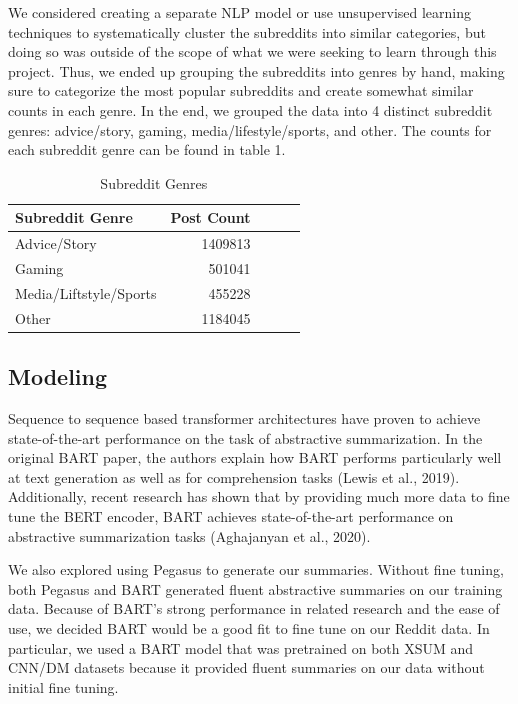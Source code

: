 \documentclass[11pt,a4paper, twocolumn]{article}
\begin{document}
We considered creating a separate NLP model or use unsupervised learning techniques to systematically cluster the subreddits into similar categories, 
but doing so was outside of the scope of what we were seeking to learn through this project. 
Thus, we ended up grouping the subreddits into genres by hand, making sure to categorize the most popular subreddits and create somewhat similar counts in each genre. 
In the end, we grouped the data into 4 distinct subreddit genres: advice/story, gaming, media/lifestyle/sports, and other. 
The counts for each subreddit genre can be found in table 1.

\begin{table}[h]
  \centering
  \begin{tabular}{lrlll}
  \hline \textbf{Subreddit Genre} & \textbf{Post Count}\\ \hline
  Advice/Story & 1409813 \\
  Gaming & 501041 \\
  Media/Liftstyle/Sports & 455228 \\
  Other & 1184045 \\
  \hline
  \end{tabular}
  \caption{\label{subreddit_counts} Subreddit Genres}
\end{table}


\subsection{Modeling}

Sequence to sequence based transformer architectures have proven to achieve state-of-the-art performance on the task of abstractive summarization.
In the original BART paper, the authors explain how BART performs particularly well at text generation as well as for comprehension tasks (Lewis et al., 2019). 
Additionally, recent research has shown that by providing much more data to fine tune the BERT encoder, 
BART achieves state-of-the-art performance on abstractive summarization tasks (Aghajanyan et al., 2020). 

We also explored using Pegasus to generate our summaries. 
Without fine tuning, both Pegasus and BART generated fluent abstractive summaries on our training data. 
Because of BART's strong performance in related research and the ease of use, we decided BART would be a good fit to fine tune on our Reddit data. 
In particular, we used a BART model that was pretrained on both XSUM and CNN/DM datasets because it provided fluent summaries on our data without initial fine tuning. 
\end{document}
